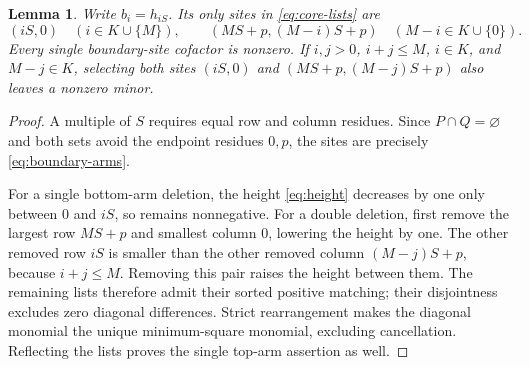 \documentclass[11pt,a4paper]{amsart}
\numberwithin{equation}{section}
\theoremstyle{plain}
\newtheorem{lemma}[theorem]{Lemma}
\theoremstyle{definition}
\begin{document}
\begin{lemma}\label{lem:boundary-minors}
Write \(b_i=h_{iS}\).  Its only sites in \eqref{eq:core-lists} are
\begin{equation}\label{eq:boundary-arms}
 (iS,0)\quad(i\in K\cup\{M\}),\qquad
 (MS+p,(M-i)S+p)\quad(M-i\in K\cup\{0\}).
\end{equation}
Every single boundary-site cofactor is nonzero.  If \(i,j>0\), \(i+j\le M\), \(i\in K\), and \(M-j\in K\), selecting both sites \((iS,0)\) and \((MS+p,(M-j)S+p)\) also leaves a nonzero minor.
\end{lemma}
\begin{proof}
A multiple of \(S\) requires equal row and column residues.  Since \(P\cap Q=\varnothing\) and both sets avoid the endpoint residues \(0,p\), the sites are precisely \eqref{eq:boundary-arms}.

For a single bottom-arm deletion, the height \eqref{eq:height} decreases by one only between \(0\) and \(iS\), so remains nonnegative.  For a double deletion, first remove the largest row \(MS+p\) and smallest column \(0\), lowering the height by one.  The other removed row \(iS\) is smaller than the other removed column \((M-j)S+p\), because \(i+j\le M\).  Removing this pair raises the height between them.  The remaining lists therefore admit their sorted positive matching; their disjointness excludes zero diagonal differences.  Strict rearrangement makes the diagonal monomial the unique minimum-square monomial, excluding cancellation.  Reflecting the lists proves the single top-arm assertion as well.
\end{proof}
\end{document}
